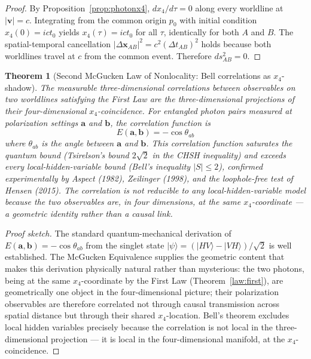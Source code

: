 \documentclass[11pt,a4paper]{article}
\newtheorem{theorem}{Theorem}
\begin{document}
\begin{proof}
By Proposition~\ref{prop:photonx4}, $dx_4/d\tau = 0$ along every worldline at $|\mathbf{v}| = c$. Integrating from the common origin $p_0$ with initial condition $x_4(0) = ict_0$ yields $x_4(\tau) = ict_0$ for all $\tau$, identically for both $A$ and $B$. The spatial-temporal cancellation $|\Delta \mathbf{x}_{AB}|^2 = c^2 (\Delta t_{AB})^2$ holds because both worldlines travel at $c$ from the common event. Therefore $ds_{AB}^2 = 0$.
\end{proof}

\begin{theorem}[Second McGucken Law of Nonlocality: Bell correlations as $x_4$-shadow]
\label{law:second}
The measurable three-dimensional correlations between observables on two worldlines satisfying the First Law are the three-dimensional projections of their four-dimensional $x_4$-coincidence. For entangled photon pairs measured at polarization settings $\mathbf{a}$ and $\mathbf{b}$, the correlation function is
\begin{equation}
\boxed{E(\mathbf{a}, \mathbf{b}) = -\cos\theta_{ab}}
\label{eq:secondlaw}
\end{equation}
where $\theta_{ab}$ is the angle between $\mathbf{a}$ and $\mathbf{b}$. This correlation function saturates the quantum bound (Tsirelson's bound $2\sqrt{2}$ in the CHSH inequality) and exceeds every local-hidden-variable bound (Bell's inequality $|S| \leq 2$), confirmed experimentally by Aspect (1982), Zeilinger (1998), and the loophole-free test of Hensen (2015). The correlation is not reducible to any local-hidden-variable model because the two observables are, in four dimensions, at the same $x_4$-coordinate --- a geometric identity rather than a causal link.
\end{theorem}

\begin{proof}[Proof sketch]
The standard quantum-mechanical derivation of $E(\mathbf{a}, \mathbf{b}) = -\cos\theta_{ab}$ from the singlet state $|\psi\rangle = (|HV\rangle - |VH\rangle)/\sqrt{2}$ is well established. The McGucken Equivalence supplies the geometric content that makes this derivation physically natural rather than mysterious: the two photons, being at the same $x_4$-coordinate by the First Law (Theorem~\ref{law:first}), are geometrically one object in the four-dimensional picture; their polarization observables are therefore correlated not through causal transmission across spatial distance but through their shared $x_4$-location. Bell's theorem excludes local hidden variables precisely because the correlation is not local in the three-dimensional projection --- it is local in the four-dimensional manifold, at the $x_4$-coincidence.
\end{proof}
\end{document}
